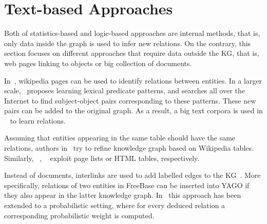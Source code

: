 \section{Text-based Approaches}

Both of statistics-based and logic-based approaches are internal methods, that is, only data inside the graph is used to infer new relations. On the contrary, this section focuses on different approaches that require data outside the KG, that is, web pages linking to objects or big collection of documents.

In~\cite{ref18}, wikipedia pages can be used to identify relations between entities. In a larger scale,~\cite{ref19} proposes learning lexical predicate patterns, and searches all over the Internet to find subject-object pairs corresponding to these patterns. These new pairs can be added to the original graph. As a result, a big text corpora is used in ~\cite{ref19} to learn relations.

Assuming that entities appearing in the same table should have the same relations, authors in~\cite{ref20} try to refine knowledge graph based on Wikipedia tables. Similarly, ~\cite{ref21}, ~\cite{ref22} exploit page lists or HTML tables, respectively.

Instead of documents, interlinks are used to add labelled edges to the KG~\cite{ref23, ref24}. More specifically, relations of two entities in FreeBase can be inserted into YAGO if they also appear in the latter knowledge graph. In~\cite{ref25} this approach has been extended to a probabilistic setting, where for every deduced relation a corresponding probabilistic weight is computed.